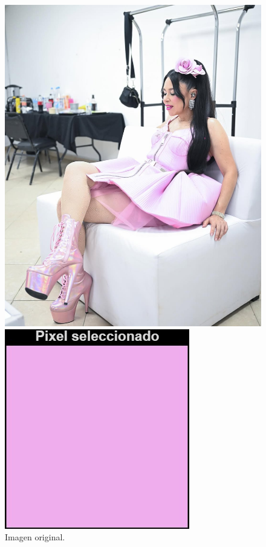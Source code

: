 \documentclass[11pt, letterpaper]{article}
\begin{document}
\begin{figure}[h!]
	\centering
	\begin{minipage}{0.4\textwidth}
		\centering
		\includegraphics[width=\textwidth]{IMG/IM4.jpeg}
		\caption*{Imagen original.}
	\end{minipage}\hfill
	\begin{minipage}{0.4\textwidth}
		\centering
		\includegraphics[width=\textwidth]{IMG/PIXEL.jpg}

\end{minipage}
\end{figure}
\end{document}
